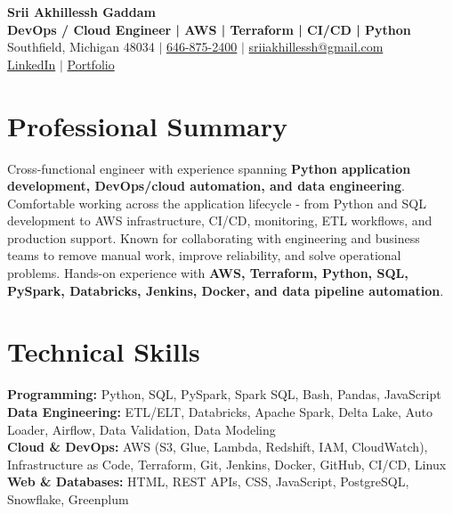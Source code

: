 \documentclass[letterpaper,10pt]{article}
\begin{document}
\fontsize{9.35pt}{10.45pt}\selectfont

\begin{center}
    {\LARGE \textbf{Srii Akhillessh Gaddam}} \\[-1pt]
    \textbf{DevOps / Cloud Engineer | AWS | Terraform | CI/CD | Python} \\[2pt]
    Southfield, Michigan 48034 $|$
    \href{tel:6468752400}{646-875-2400} $|$
    \href{mailto:sriiakhillessh@gmail.com}{sriiakhillessh@gmail.com} \\[1pt]
    \href{https://www.linkedin.com/in/srii-akhiilessh-gaddam-b48668191/}{LinkedIn} $|$
    \href{https://sriiakhillesshg.github.io/portfolio/}{Portfolio}
\end{center}
\vspace{-8pt}

\section{Professional Summary}
\small{Cross-functional engineer with experience spanning \textbf{Python application development, DevOps/cloud automation, and data engineering}. Comfortable working across the application lifecycle - from Python and SQL development to AWS infrastructure, CI/CD, monitoring, ETL workflows, and production support. Known for collaborating with engineering and business teams to remove manual work, improve reliability, and solve operational problems. Hands-on experience with \textbf{AWS, Terraform, Python, SQL, PySpark, Databricks, Jenkins, Docker, and data pipeline automation}.}

\section{Technical Skills}
\small{
\textbf{Programming:} Python, SQL, PySpark, Spark SQL, Bash, Pandas, JavaScript \\
\textbf{Data Engineering:} ETL/ELT, Databricks, Apache Spark, Delta Lake, Auto Loader, Airflow, Data Validation, Data Modeling \\
\textbf{Cloud \& DevOps:} AWS (S3, Glue, Lambda, Redshift, IAM, CloudWatch), Infrastructure as Code, Terraform, Git, Jenkins, Docker, GitHub, CI/CD, Linux \\
\textbf{Web \& Databases:} HTML, REST APIs, CSS, JavaScript, PostgreSQL, Snowflake, Greenplum
}
\end{document}
